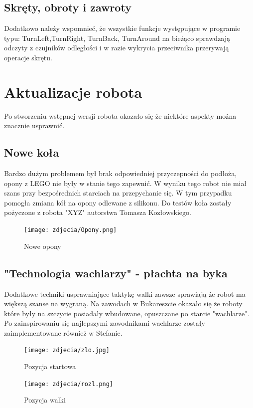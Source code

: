 \documentclass[polish,polish,a4paper]{article}
\begin{document}
    
    \subsection{Skręty, obroty i zawroty}
    Dodatkowo należy wspomnieć, że wszystkie funkcje występujące w programie typu: TurnLeft,TurnRight, TurnBack, TurnAround na bieżąco sprawdzają odczyty z czujników odległości i w razie wykrycia przeciwnika przerywają operacje skrętu.
   \newpage
\section{Aktualizacje robota}
    Po stworzeniu wstępnej wersji robota okazało się że niektóre aspekty można znacznie usprawnić.
    \subsection{Nowe koła}
    Bardzo dużym problemem był brak odpowiedniej przyczepności do podłoża, opony z LEGO nie były w stanie tego zapewnić. W wyniku tego robot nie miał szans przy bezpośrednich starciach na przepychanie się. W tym przypadku pomogła zmiana kół na opony odlewane z silikonu. Do testów koła zostały pożyczone z robota "XYZ" autorstwa Tomasza Kozłowskiego.
    
    \begin{figure}[ht!]
        \centering
        \texttt{[image: zdjecia/Opony.png]}
        \caption{Nowe opony \label{overflow}}
        \end{figure}
    
    \subsection{"Technologia wachlarzy" - płachta na byka}
    Dodatkowe techniki usprawniające taktykę walki zawsze sprawiają że robot ma większą szanse na wygraną. Na zawodach w Bukareszcie okazało się że roboty które były na szczycie posiadały wbudowane, opuszczane po starcie "wachlarze". Po zainspirowaniu się najlepszymi zawodnikami wachlarze zostały zaimplementowane również w Stefanie. 

    \begin{figure}[!htb]
       \begin{minipage}{0.3\textwidth}
         \centering
         \texttt{[image: zdjecia/zlo.jpg]}
         \caption{Pozycja startowa}\label{Fig:Data1}
       \end{minipage}\hspace{0mm}
       \begin{minipage}{0.3\textwidth}
         \centering
         \texttt{[image: zdjecia/rozl.png]}
         \caption{Pozycja walki}\label{Fig:Data2}
       \end{minipage}
        \end{figure}
    
\end{document}
